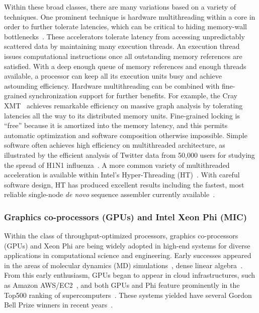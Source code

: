 Within these broad classes, there are many variations based on a variety of techniques.
One prominent technique is hardware multithreading within a core in order to further tolerate latencies, which can be critical to hiding memory-wall bottlenecks~\cite{Alverson:1990mt,Wulf:1995mw}.
These accelerators tolerate latency
from accessing unpredictably scattered data by maintaining many execution threads. An execution
thread issues computational instructions once all outstanding memory references are satisfied. With
a deep enough queue of memory references and enough threads available, a processor can keep
all its execution units busy and achieve astounding efficiency.
Hardware multithreading can be combined with fine-grained synchronization support for further benefits.
For example, the Cray XMT~\cite{CrayInc.2007} achieves remarkable efficiency on
massive graph analysis by tolerating latencies all the way to its distributed memory units. Fine-grained
locking is ``free'' because it is amortized into the memory latency, and this permits automatic
optimization and software composition otherwise impossible. 
Simple software often achieves high
efficiency on multithreaded architecture, as illustrated by the efficient analysis of Twitter data
from 50,000 users for studying the spread of H1N1 influenza~\cite{Ediger2010a}. 
A more common variety of
multithreaded acceleration is available within Intel's Hyper-Threading (HT)~\cite{IntelCorp.2002,Riedy2011b,pasqual}. 
With
careful software design, HT has produced excellent results including the fastest, most reliable
single-node \textit{de novo} sequence assembler currently available~\cite{pasqual}.

\subsubsection{Graphics co-processors (GPUs) and Intel Xeon Phi (MIC)}
Within the class of throughput-optimized processors, graphics co-processors (GPUs) and Xeon Phi are being widely adopted in high-end systems for diverse applications in computational science and engineering.
Early successes appeared in the areas of molecular dynamics (MD) simulations~\cite{moleculardynamics},
dense linear algebra~\cite{denselinearalgebra}.
From this early enthusiasm, GPUs began to appear in cloud infrastructures, such as Amazon AWS/EC2~\cite{AmazonGPU}, and both GPUs and Phi feature prominently in the Top500 ranking of supercomputers~\cite{Meuer2013}.
These systems yielded have several Gordon Bell Prize winners in recent years~\cite{Hamada09,conf/sc/RahimianLVCMMSSVVZB10,Shimokawabe:2011:PPS:2063384.2063388}.

